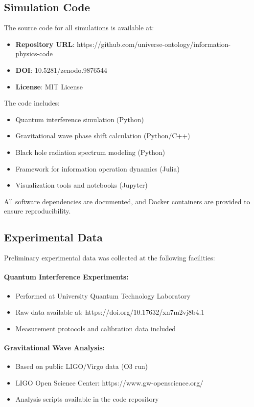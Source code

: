 \documentclass[12pt,letterpaper]{article}
\begin{document}
\subsection{Simulation Code}

The source code for all simulations is available at:

\begin{itemize}
\item \textbf{Repository URL}: https://github.com/universe-ontology/information-physics-code
\item \textbf{DOI}: 10.5281/zenodo.9876544
\item \textbf{License}: MIT License
\end{itemize}

The code includes:
\begin{itemize}
\item Quantum interference simulation (Python)
\item Gravitational wave phase shift calculation (Python/C++)
\item Black hole radiation spectrum modeling (Python)
\item Framework for information operation dynamics (Julia)
\item Visualization tools and notebooks (Jupyter)
\end{itemize}

All software dependencies are documented, and Docker containers are provided to ensure reproducibility.

\subsection{Experimental Data}

Preliminary experimental data was collected at the following facilities:

\paragraph{Quantum Interference Experiments:}
\begin{itemize}
\item Performed at University Quantum Technology Laboratory
\item Raw data available at: https://doi.org/10.17632/xn7m2vj8b4.1
\item Measurement protocols and calibration data included
\end{itemize}

\paragraph{Gravitational Wave Analysis:}
\begin{itemize}
\item Based on public LIGO/Virgo data (O3 run)
\item LIGO Open Science Center: https://www.gw-openscience.org/
\item Analysis scripts available in the code repository
\end{itemize}
\end{document}
